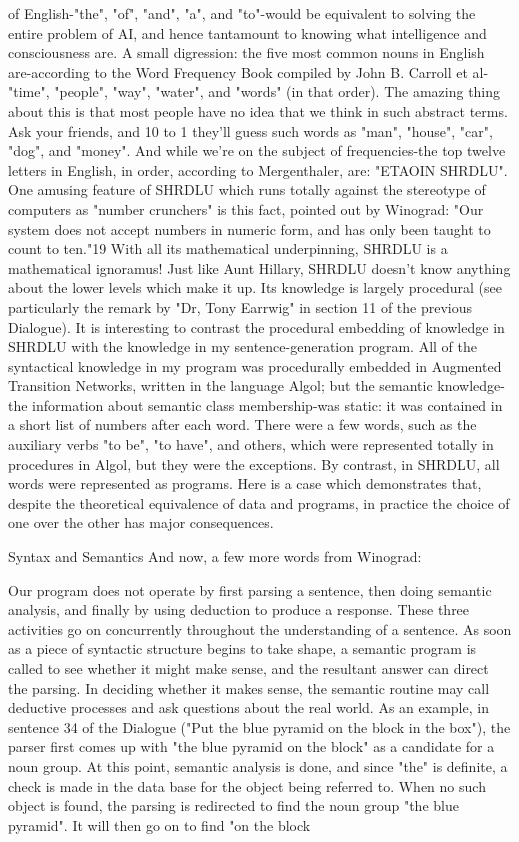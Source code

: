 {of English-"the", "of", "and", "a", and "to"-would be equivalent to solving the entire
problem of AI, and hence tantamount to knowing what intelligence and consciousness
are. A small digression: the five most common nouns in English are-according to the
Word Frequency Book compiled by John B. Carroll et al-"time", "people", "way",
"water", and "words" (in that order). The amazing thing about this is that most people
have no idea that we think in such abstract terms. Ask your friends, and 10 to 1 they'll
guess such words as "man", "house", "car", "dog", and "money". And while we're on the
subject of frequencies-the top twelve letters in English, in order, according to
Mergenthaler, are: "ETAOIN SHRDLU".
         One amusing feature of SHRDLU which runs totally against the stereotype of
computers as "number crunchers" is this fact, pointed out by Winograd: "Our system does
not accept numbers in numeric form, and has only been taught to count to ten."19 With
all its mathematical underpinning, SHRDLU is a mathematical ignoramus! Just like Aunt
Hillary, SHRDLU doesn't know anything about the lower levels which make it up. Its
knowledge is largely procedural (see particularly the remark by "Dr, Tony Earrwig" in
section 11 of the previous Dialogue).
         It is interesting to contrast the procedural embedding of knowledge in SHRDLU
with the knowledge in my sentence-generation program. All of the syntactical knowledge
in my program was procedurally embedded in Augmented Transition Networks, written
in the language Algol; but the semantic knowledge-the information about semantic class
membership-was static: it was contained in a short list of numbers after each word. There
were a few words, such as the auxiliary verbs "to be", "to have", and others, which were
represented totally in procedures in Algol, but they were the exceptions. By contrast, in
SHRDLU, all words were represented as programs. Here is a case which demonstrates
that, despite the theoretical equivalence of data and programs, in practice the choice of
one over the other has major consequences.

                                Syntax and Semantics
And now, a few more words from Winograd:

   Our program does not operate by first parsing a sentence, then doing semantic
   analysis, and finally by using deduction to produce a response. These three
   activities go on concurrently throughout the understanding of a sentence. As soon
   as a piece of syntactic structure begins to take shape, a semantic program
   is called to see whether it might make sense, and the resultant answer can direct the
   parsing. In deciding whether it makes sense, the semantic routine may call
   deductive processes and ask questions about the real world. As an
   example, in sentence 34 of the Dialogue ("Put the blue pyramid on the block in the
   box"), the parser first comes up with "the blue pyramid on the block" as a candidate
   for a noun group. At this point, semantic analysis is done, and since "the" is
   definite, a check is made in the data base for the object being referred to. When no
   such object is found, the parsing is redirected to find the noun group "the blue
   pyramid". It will then go on to find "on the block




}
